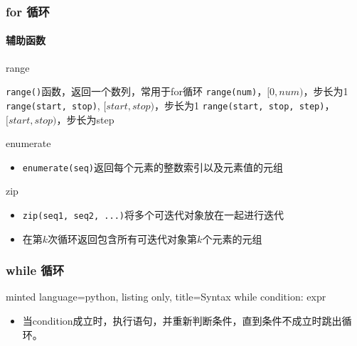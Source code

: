 \documentclass[10pt]{beamer}
\begin{document}
\begin{frame}
    \frametitle{for 循环}
    \framesubtitle{辅助函数}

    \begin{block}{range}
        \begin{outline}
            \1 \texttt{range()}函数，返回一个数列，常用于for循环
            \2 \texttt{range(num)}，$[0, {num})$，步长为1
            \2 \texttt{range(start, stop)}, $[start, stop)$，步长为1
            \2 \texttt{range(start, stop, step)}，$[start, stop)$，步长为step
        \end{outline}
    \end{block}

    \begin{block}{enumerate}
        \begin{itemize}
            \item \texttt{enumerate(seq)}返回每个元素的整数索引以及元素值的元组
        \end{itemize}
    \end{block}

    \begin{block}{zip}
        \begin{itemize}
            \item \texttt{zip(seq1, seq2, ...)}将多个可迭代对象放在一起进行迭代
            \item 在第$k$次循环返回包含所有可迭代对象第$k$个元素的元组
        \end{itemize}
    \end{block}
    

\end{frame}



\begin{frame}[fragile]
    \frametitle{while 循环}

    \begin{tcblisting}{minted language=python, listing only, title=Syntax}
    while condition:
        expr\end{tcblisting}
    \begin{itemize}
        \item 当condition成立时，执行语句，并重新判断条件，直到条件不成立时跳出循环。
    \end{itemize}
\end{frame}
\end{document}
